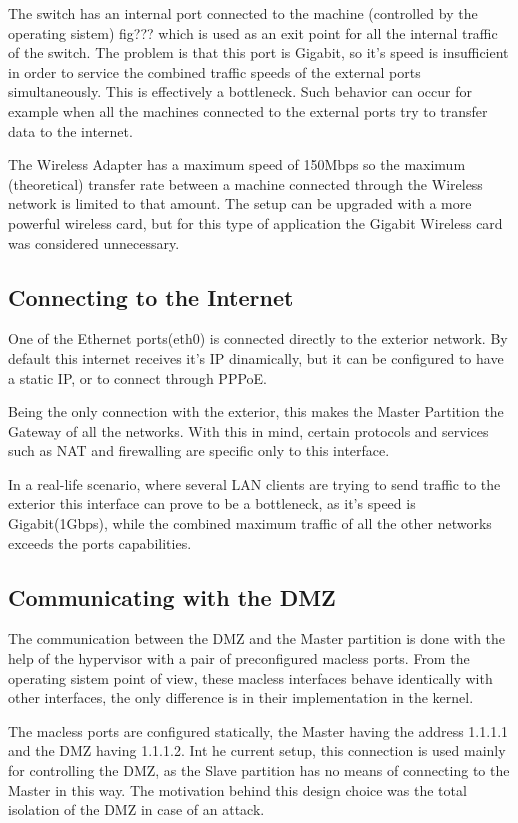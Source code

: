 The switch has an internal port connected to the machine (controlled by the
operating sistem) fig??? which is used as an exit point for all the internal
traffic of the switch. The problem is that this port is Gigabit,
so it's speed is insufficient in order to service the combined traffic
speeds of the external ports simultaneously. This is effectively a bottleneck.
Such behavior can occur for example when all the machines connected to the 
external ports try to transfer data to the internet.

The Wireless Adapter has a maximum speed of 150Mbps so the maximum 
(theoretical) transfer rate between a machine connected through 
the Wireless network is limited to that amount.
The setup can be upgraded with a  more powerful wireless card, 
but for this type of application the Gigabit Wireless card was considered
unnecessary.

\subsection{Connecting to the Internet}
One of the Ethernet ports(eth0) is connected directly to the exterior network.
By default this internet receives it's IP dinamically, but it can be
configured to have a static IP, or to connect through PPPoE.

Being the only connection with the exterior, this makes the Master Partition
the Gateway of all the networks. With this in mind, certain protocols and
services such as NAT and firewalling are specific only to this interface.

In a real-life scenario, where several LAN clients are trying to send
traffic to the exterior this interface can prove to be a bottleneck, as 
it's speed is Gigabit(1Gbps), while the combined maximum traffic of all the
other networks exceeds the ports capabilities.

\subsection{Communicating with the DMZ}
The communication between the DMZ and the Master partition is done with the
help of the hypervisor with a pair of preconfigured macless ports.
From the operating sistem point of view, these macless interfaces behave
identically with other interfaces, the only difference is in their
implementation in the kernel.

The macless ports are configured statically, the Master having the address
1.1.1.1 and the DMZ having 1.1.1.2. Int he current setup, this connection
is used mainly for controlling the DMZ, as the Slave partition has no means
of connecting to the Master in this way. The motivation behind this design
choice was the total isolation of the DMZ in case of an attack.

